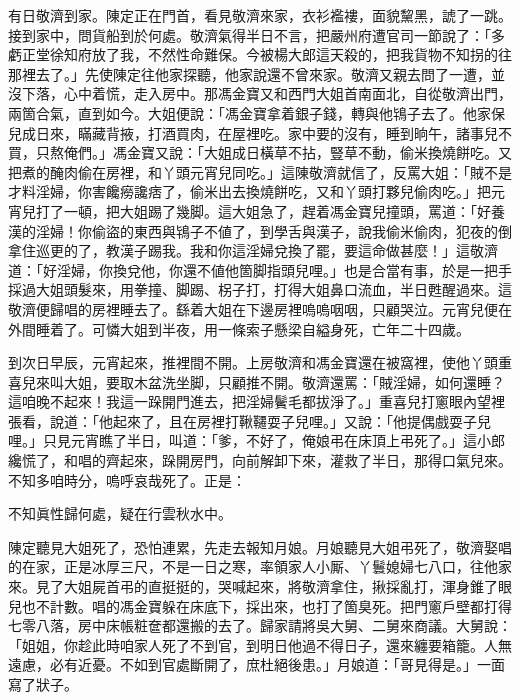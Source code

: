 有日敬濟到家。陳定正在門首，看見敬濟來家，衣衫襤褸，面貌黧黑，諕了一跳。接到家中，問貨船到於何處。敬濟氣得半日不言，把嚴州府遭官司一節說了：「多虧正堂徐知府放了我，不然性命難保。{}今被楊大郎這天殺的，把我貨物不知拐的往那裡去了。」先使陳定往他家探聽，他家說還不曾來家。敬濟又親去問了一遭，並沒下落，心中着慌，走入房中。那馮金寶又和西門大姐首南面北，自從敬濟出門，兩箇合氣，直到如今。大姐便說：「馮金寶拿着銀子錢，轉與他鴇子去了。他家保兒成日來，瞞藏背掖，打酒買肉，在屋裡吃。家中要的沒有，睡到晌午，諸事兒不買，只熬俺們。」馮金寶又說：「大姐成日橫草不拈，豎草不動，偷米換燒餅吃。又把煮的醃肉偷在房裡，和丫頭元宵兒同吃。」這陳敬濟就信了，{}反罵大姐：「賊不是才料淫婦，你害饞癆讒痞了，偷米出去換燒餅吃，又和丫頭打夥兒偷肉吃。」把元宵兒打了一頓，把大姐踢了幾脚。這大姐急了，趕着馮金寶兒撞頭，罵道：「好養漢的淫婦！你偷盜的東西與鴇子不値了，到學舌與漢子，說我偷米偷肉，犯夜的倒拿住巡更的了，教漢子踢我。我和你這淫婦兌換了罷，要這命做甚麼！」這敬濟道：「好淫婦，你換兌他，你還不値他箇脚指頭兒哩。」也是合當有事，於是一把手採過大姐頭髮來，用拳撞、脚踢、柺子打，打得大姐鼻口流血，半日甦醒過來。這敬濟便歸唱的房裡睡去了。繇着大姐在下邊房裡嗚嗚咽咽，只顧哭泣。{}元宵兒便在外間睡着了。可憐大姐到半夜，用一條索子懸梁自縊身死，亡年二十四歲。

到次日早辰，元宵起來，推裡間不開。上房敬濟和馮金寶還在被窩裡，使他丫頭重喜兒來叫大姐，要取木盆洗坐脚，只顧推不開。敬濟還罵：「賊淫婦，如何還睡？這咱晚不起來！我這一跺開門進去，把淫婦鬢毛都拔淨了。」重喜兒打窻眼內望裡張看，說道：「他起來了，且在房裡打鞦韆耍子兒哩。」又說：「他提偶戲耍子兒哩。」只見元宵瞧了半日，叫道：「爹，不好了，俺娘弔在床頂上弔死了。」這小郎纔慌了，和唱的齊起來，跺開房門，向前解卸下來，灌救了半日，那得口氣兒來。不知多咱時分，嗚呼哀哉死了。正是：

\begin{myquote}
不知眞性歸何處，疑在行雲秋水中。
\end{myquote}

陳定聽見大姐死了，恐怕連累，先走去報知月娘。{}月娘聽見大姐弔死了，敬濟娶唱的在家，正是冰厚三尺，不是一日之寒，率領家人小厮、丫鬟媳婦七八口，往他家來。見了大姐屍首弔的直挺挺的，哭喊起來，將敬濟拿住，揪採亂打，渾身錐了眼兒也不計數。{}唱的馮金寶躲在床底下，採出來，也打了箇臭死。把門窻戶壁都打得七零八落，房中床帳粧奩都還搬的去了。歸家請將吳大舅、二舅來商議。大舅說：「姐姐，你趁此時咱家人死了不到官，到明日他過不得日子，還來纏要箱籠。人無遠慮，必有近憂。不如到官處斷開了，庶杜絕後患。」{}月娘道：「哥見得是。」一面寫了狀子。


